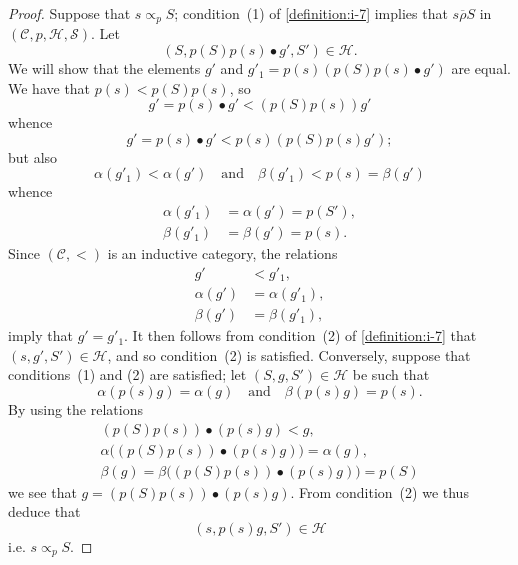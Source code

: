 \documentclass[a4paper,fleqn]{article}
\theoremstyle{plain}
\theoremstyle{definition}
\newcommand{\oldpage}[1]{{\marginpar{\footnotesize$\bigg\vert$\,\,\,\,\textit{p.~#1}}}}
\newcommand{\textand}{\quad\text{and}\quad}
\newcommand{\CC}{\mathcal{C}}
\newcommand{\HH}{\mathcal{H}}
\renewcommand{\SS}{\mathcal{S}}
\newcommand{\relrhobar}{\mathrel{\overline{\rho}}}
\newcommand{\subs}{\mathrel{\propto}}
\newcommand{\smallbullet}{\bullet}
\begin{document}
\begin{proof}
  Suppose that $s\subs_p S$;
  condition~(1) of \cref{definition:i-7} implies that $s\relrhobar S$ in $(\CC,p,\HH,\SS)$.
  Let
  \[
    (S,p(S)p(s)\smallbullet g',S')\in\HH.
  \]
  We will show that the elements $g'$ and $g'_1=p(s)(p(S)p(s)\smallbullet g')$ are equal.
  We have that $p(s)<p(S)p(s)$, so
  \[
    g'
    = p(s)\smallbullet g'
    < (p(S)p(s))g'
  \]
  whence
  \[
    g'
    = p(s)\smallbullet g'
    < p(s)(p(S)p(s)g');
  \]
  \oldpage{361}
  but also
  \[
    \alpha(g'_1)<\alpha(g')
    \textand
    \beta(g'_1)<p(s)=\beta(g')
  \]
  whence
  \[
    \begin{aligned}
      \alpha(g'_1)
      &= \alpha(g')
      = p(S'),
    \\\beta(g'_1)
      &= \beta(g')
      = p(s).
    \end{aligned}
  \]
  Since $(\CC,<)$ is an inductive category, the relations
  \[
    \begin{aligned}
      g'
      &< g'_1,
    \\\alpha(g')
      &= \alpha(g'_1),
    \\\beta(g')
      &= \beta(g'_1),
    \end{aligned}
  \]
  imply that $g'=g'_1$.
  It then follows from condition~(2) of \cref{definition:i-7} that $(s,g',S')\in\HH$, and so condition~(2\textquotesingle) is satisfied.
  Conversely, suppose that conditions~(1\textquotesingle) and (2\textquotesingle) are satisfied;
  let $(S,g,S')\in\HH$ be such that
  \[
    \alpha(p(s)g)=\alpha(g)
    \textand
    \beta(p(s)g)=p(s).
  \]
  By using the relations
  \[
    \begin{gathered}
      (p(S)p(s))\smallbullet(p(s)g)<g,
    \\\alpha\big((p(S)p(s))\smallbullet(p(s)g)\big)=\alpha(g),
    \\\beta(g)=\beta\big((p(S)p(s))\smallbullet(p(s)g)\big)=p(S)
    \end{gathered}
  \]
  we see that $g=(p(S)p(s))\smallbullet(p(s)g)$.
  From condition~(2\textquotesingle) we thus deduce that
  \[
    (s,p(s)g,S')\in\HH
  \]
  i.e. $s\subs_p S$.
\end{proof}
\end{document}
